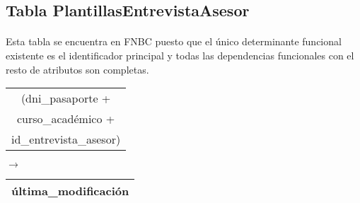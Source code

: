 \subsection{Tabla PlantillasEntrevistaAsesor}

  \paragraph{}Esta tabla se encuentra en FNBC puesto que el único determinante
  funcional existente es el identificador principal y todas las dependencias
  funcionales con el resto de atributos son completas.

  \begin{center}
    \begin{minipage}{4.1cm}{\begin{flushright}\begin{tabular}{ | c | }
                  \hline
                  (dni\_pasaporte + \\
                  curso\_académico + \\
                  id\_entrevista\_asesor) \\
                  \hline
                 \end{tabular}\end{flushright} }
    \end{minipage}
    \begin{minipage}{0.7cm}{$\longrightarrow$}
    \end{minipage}
    \begin{minipage}{5.9cm}{\begin{tabular}{ | c | }
                  \hline
                  última\_modificación \\
                  \hline
                 \end{tabular} }
    \end{minipage}
  \end{center}
